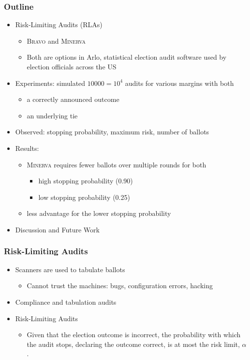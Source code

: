\documentclass{beamer}
\newcommand{\Minerva}{\textsc{Minerva}\xspace}
\newcommand{\BRAVO}{\textsc{Bravo}\xspace}
\begin{document}
\begin{frame}
\frametitle{Outline}

\begin{itemize}
\item Risk-Limiting Audits (RLAs)
\begin{itemize}
\item \BRAVO and \Minerva
\pause
\item Both are options in Arlo, statistical election audit software used by election officials across the US
\end{itemize}
\pause 
\item Experiments: simulated $10000=10^4$ audits for various margins with both
\begin{itemize}
\item a correctly announced outcome 
\item an underlying tie
\end{itemize}
\pause 
\item Observed: stopping probability, maximum risk, number of ballots
\pause 
\item Results:
\begin{itemize}
\item \Minerva requires fewer ballots over multiple rounds for both 
\begin{itemize}
\item high stopping probability (0.90)
\item low stopping probability (0.25)
\end{itemize}
\item less advantage for the lower stopping probability
\end{itemize}
\pause 
\item Discussion and Future Work
\end{itemize}

\end{frame}


\begin{frame}
\frametitle{Risk-Limiting Audits}

\begin{itemize}
\item Scanners are used to tabulate ballots
\pause 
\begin{itemize}
\item Cannot trust the machines: bugs, configuration errors, hacking
\pause 
\end{itemize}
\item Compliance and tabulation audits
\pause 
\item Risk-Limiting Audits
\begin{itemize}
\item
Given that the election outcome is incorrect,
the probability with which the audit stops, declaring the outcome correct, is at most the risk limit, $\alpha$.
\end{itemize}
\end{itemize}
\end{frame}
\end{document}
